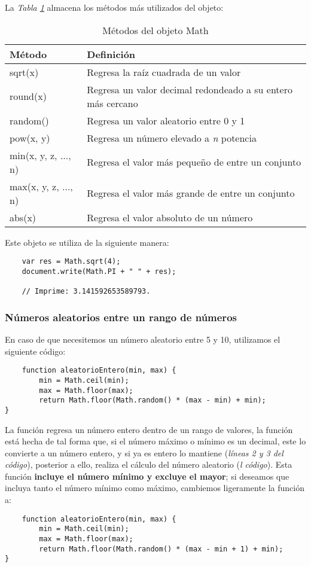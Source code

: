 La \textit{Tabla \ref{tab: 7}} almacena los métodos más utilizados del objeto:
\begin{table}[H]
    \begin{center}
        \caption{Métodos del objeto Math}
        \label{tab: 7}
        \begin{tabular}{m{4cm} m{9cm}}
            \hline
            \textbf{Método}&\textbf{Definición} \\
            \hline
            sqrt(x) & Regresa la raíz cuadrada de un valor \\
            round(x) & Regresa un valor decimal redondeado a su entero más cercano \\
            random() & Regresa un valor aleatorio entre 0 y 1 \\
            pow(x, y) & Regresa un número elevado a \textit{n} potencia \\
            min(x, y, z, ..., n) & Regresa el valor más pequeño de entre un conjunto \\
            max(x, y, z, ..., n) & Regresa el valor más grande de entre un conjunto \\
            abs(x) & Regresa el valor absoluto de un número \\
            \hline
        \end{tabular}
    \end{center}
\end{table}

Este objeto se utiliza de la siguiente manera:
\begin{lstlisting}
    var res = Math.sqrt(4);
    document.write(Math.PI + " " + res);

    // Imprime: 3.141592653589793.
\end{lstlisting}


\subsubsection{Números aleatorios entre un rango de números}

En caso de que necesitemos un número aleatorio entre 5 y 10, utilizamos el siguiente código:
\begin{lstlisting}
    function aleatorioEntero(min, max) {
        min = Math.ceil(min);
        max = Math.floor(max);
        return Math.floor(Math.random() * (max - min) + min);
}
\end{lstlisting}

La función regresa un número entero dentro de un rango de valores, la función está hecha de tal forma que, si el número máximo o mínimo es un decimal, este lo convierte a un número entero, y si ya es entero lo mantiene (\textit{líneas 2 y 3 del código}), posterior a ello, realiza el cálculo del número aleatorio (\textit{l código}). Esta función \textbf{incluye el número mínimo y excluye el mayor}; si deseamos que incluya tanto el número mínimo como máximo, cambiemos ligeramente la función a:
\begin{lstlisting}
    function aleatorioEntero(min, max) {
        min = Math.ceil(min);
        max = Math.floor(max);
        return Math.floor(Math.random() * (max - min + 1) + min);
}
\end{lstlisting}

